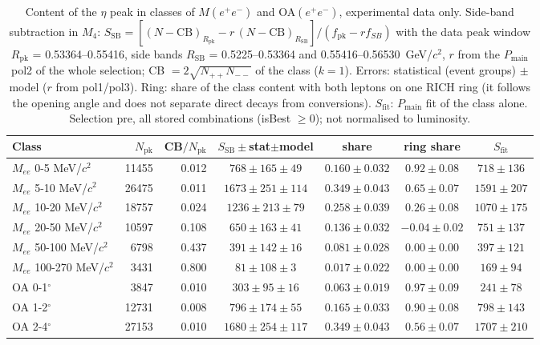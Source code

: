 \begin{table}[H]
\centering\footnotesize
\setlength{\tabcolsep}{3pt}
\caption{Content of the $\eta$ peak in classes of $M(e^+e^-)$ and OA$(e^+e^-)$, experimental data only. Side-band subtraction in $M_4$: $S_\mathrm{SB}=[(N-\mathrm{CB})_{R_\mathrm{pk}}-r\,(N-\mathrm{CB})_{R_\mathrm{SB}}]/(f_\mathrm{pk}-r f_{SB})$ with the data peak window $R_\mathrm{pk}$ = 0.53364--0.55416, side bands $R_\mathrm{SB}$ = 0.5225--0.53364 and 0.55416--0.56530~GeV/$c^2$, $r$ from the $P_\mathrm{main}$ pol2 of the whole selection; CB $=2\sqrt{N_{++}N_{--}}$ of the class ($k=1$). Errors: statistical (event groups) $\pm$ model ($r$ from pol1/pol3). Ring: share of the class content with both leptons on one RICH ring (it follows the opening angle and does not separate direct decays from conversions). $S_\mathrm{fit}$: $P_\mathrm{main}$ fit of the class alone. Selection pre, all stored combinations (isBest $\geq0$); not normalised to luminosity.}
\label{tab:res_mee}
\begin{tabular}{lrrcccc}
\toprule
Class & $N_\mathrm{pk}$ & CB$/N_\mathrm{pk}$ & $S_\mathrm{SB}\pm$stat$\pm$model & share & ring share & $S_\mathrm{fit}$ \\
\midrule
$M_{ee}$ 0-5 MeV/$c^2$ & 11455 & 0.012 & $768\pm165\pm49$ & $0.160\pm0.032$ & $0.92\pm0.08$ & $718\pm136$ \\
$M_{ee}$ 5-10 MeV/$c^2$ & 26475 & 0.011 & $1673\pm251\pm114$ & $0.349\pm0.043$ & $0.65\pm0.07$ & $1591\pm207$ \\
$M_{ee}$ 10-20 MeV/$c^2$ & 18757 & 0.024 & $1236\pm213\pm79$ & $0.258\pm0.039$ & $0.26\pm0.08$ & $1070\pm175$ \\
$M_{ee}$ 20-50 MeV/$c^2$ & 10597 & 0.108 & $650\pm163\pm41$ & $0.136\pm0.032$ & $-0.04\pm0.02$ & $751\pm137$ \\
$M_{ee}$ 50-100 MeV/$c^2$ & 6798 & 0.437 & $391\pm142\pm16$ & $0.081\pm0.028$ & $0.00\pm0.00$ & $397\pm121$ \\
$M_{ee}$ 100-270 MeV/$c^2$ & 3431 & 0.800 & $81\pm108\pm3$ & $0.017\pm0.022$ & $0.00\pm0.00$ & $169\pm94$ \\
\midrule
OA 0-1$^\circ$ & 3847 & 0.010 & $303\pm95\pm16$ & $0.063\pm0.019$ & $0.97\pm0.09$ & $241\pm78$ \\
OA 1-2$^\circ$ & 12731 & 0.008 & $796\pm174\pm55$ & $0.165\pm0.033$ & $0.90\pm0.08$ & $798\pm143$ \\
OA 2-4$^\circ$ & 27153 & 0.010 & $1680\pm254\pm117$ & $0.349\pm0.043$ & $0.56\pm0.07$ & $1707\pm210$ \\

\end{tabular}
\end{table}
